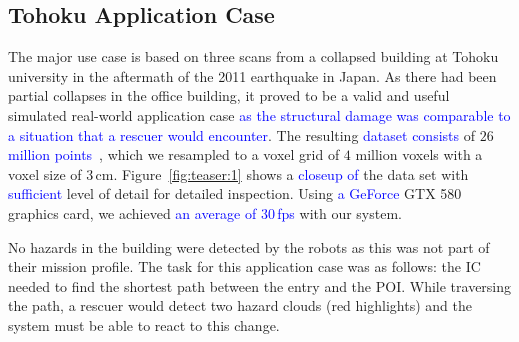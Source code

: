 \documentclass{egpubl}
\newcommand{\diff}[1]{\textcolor{blue}{#1}}
\begin{document}
\subsection{Tohoku Application Case} \label{sec:results:applicationcase}

The major use case is based on three scans from a collapsed building at Tohoku university in the aftermath of the 2011 earthquake in Japan. As there had been partial collapses in the office building, it proved to be a valid and useful simulated real-world application case \diff{as the structural damage was comparable to a situation that a rescuer would encounter}. The resulting \diff{dataset consists} of $26$ \diff{million points}~\cite{journals/jfr/NagataniKOOYTNYKFK13}, which we resampled to a voxel grid of $4$ million voxels with a voxel size of 3\,cm. Figure~\ref{fig:teaser:1} shows a \diff{closeup of} the data set with \diff{sufficient} level of detail for detailed inspection. Using \diff{a GeForce} GTX 580 graphics card, we achieved \diff{an average of 30\,fps} with our system.

No hazards in the building were detected by the robots as this was not part of their mission profile. The task for this application case was as follows: the IC needed to find the shortest path between the entry and the POI. While traversing the path, a rescuer would detect two hazard clouds (red highlights) and the system must be able to react to this change.
\end{document}
